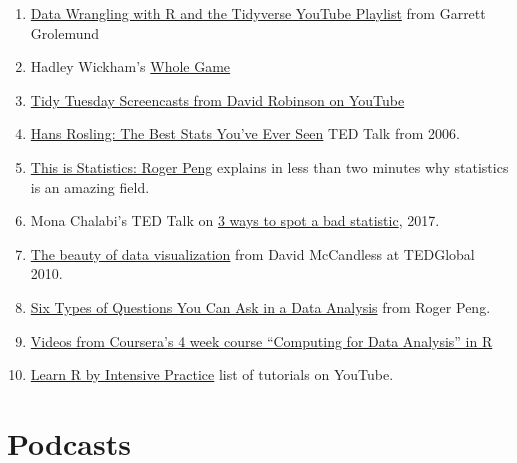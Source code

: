 \documentclass[
]{book}
\providecommand{\tightlist}{%
  \setlength{\itemsep}{0pt}\setlength{\parskip}{0pt}}
\begin{document}
\begin{enumerate}
\def\labelenumi{\arabic{enumi}.}
\setcounter{enumi}{1}
\tightlist
\item
  \href{https://www.youtube.com/playlist?list=PL9HYL-VRX0oQOWAFoKHFQAsWAI3ImbNPk}{Data Wrangling with R and the Tidyverse YouTube Playlist} from Garrett Grolemund
\item
  Hadley Wickham's \href{https://www.youtube.com/watch?v=go5Au01Jrvs}{Whole Game}
\item
  \href{https://www.youtube.com/channel/UCeiiqmVK07qhY-wvg3IZiZQ}{Tidy Tuesday Screencasts from David Robinson on YouTube}
\item
  \href{https://www.ted.com/talks/hans_rosling_shows_the_best_stats_you_ve_ever_seen}{Hans Rosling: The Best Stats You've Ever Seen} TED Talk from 2006.
\item
  \href{https://www.youtube.com/watch?v=WMDAR2bZEp0}{This is Statistics: Roger Peng} explains in less than two minutes why statistics is an amazing field.
\item
  Mona Chalabi's TED Talk on \href{https://www.ted.com/talks/mona_chalabi_3_ways_to_spot_a_bad_statistic}{3 ways to spot a bad statistic}, 2017.
\item
  \href{https://www.youtube.com/watch?v=5Zg-C8AAIGg}{The beauty of data visualization} from David McCandless at TEDGlobal 2010.
\item
  \href{https://www.youtube.com/watch?v=GRNyEzQ26Ww}{Six Types of Questions You Can Ask in a Data Analysis} from Roger Peng.
\item
  \href{https://blog.revolutionanalytics.com/2012/12/coursera-videos.html}{Videos from Coursera's 4 week course ``Computing for Data Analysis'' in R}
\item
  \href{https://www.youtube.com/user/TheLearnR}{Learn R by Intensive Practice} list of tutorials on YouTube.
\end{enumerate}

\hypertarget{podcasts}{%
\section{Podcasts}\label{podcasts}}
\end{document}

